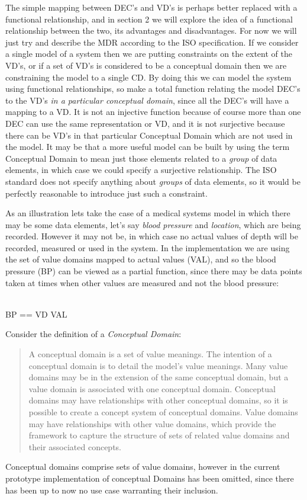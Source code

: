 \vspace{5.mm}


The simple mapping between DEC's and VD's is perhaps better replaced with a functional relationship, and in section 2 we will explore the idea of a functional relationship between the two, its advantages and disadvantages. For now we will just try and describe the MDR according to the ISO specification. If we consider a single model of a system then we are putting constraints on the extent of the VD's, or if a set of VD's is considered to be a conceptual domain then we are constraining the model to a single CD.  By doing this we can model the system using functional relationships, so make a total function relating the model DEC's to the VD's \emph{in a particular conceptual domain}, since all the DEC's will have a mapping to a VD. It is not an injective function because of course more than one DEC can use the same representation or VD, and it is not surjective because there can be VD's in that particular Conceptual Domain which are not used in the model. It may be that a more useful model can be built by using the term Conceptual Domain to mean just those elements related to a \emph{group} of data elements, in which case we could specify a surjective relationship.  The ISO standard does not specify anything about \emph{groups} of data elements, so it would be perfectly reasonable to introduce just such a constraint. 


As an illustration lets take the case of a medical systems model in which there may be some data elements, let's say \emph{blood pressure} and \emph{location}, which are being recorded.  However it may not be, in which case no actual values of depth will be recorded, measured or used in the system. In the implementation we are using the set of value domains mapped to actual values (VAL), and so the blood pressure (BP) can be viewed as a partial function, since there may be data points taken at times when other values are measured and not the blood pressure:
\begin{zed}
	[VAL]\\
	BP == VD \pfun VAL
\end{zed}
 
 

Consider the definition of a \emph{Conceptual Domain}:
\begin{quote}
	A conceptual domain is a set of value meanings. The intention of a conceptual domain is to detail the model's value meanings. Many value domains may be in the extension of the same conceptual domain, but a value domain is associated with one conceptual domain. Conceptual domains may have relationships with other conceptual domains, so it is possible to create a concept system of conceptual domains. Value domains may have relationships with other value domains, which provide the framework to capture the structure of sets of related value domains and their associated concepts.	
\end{quote}
Conceptual domains comprise sets of value domains, however in the current prototype implementation of conceptual Domains has been omitted, since there has been up to now no use case warranting their inclusion.

